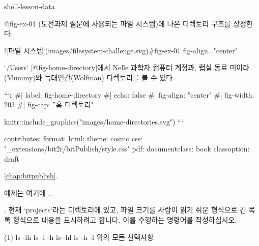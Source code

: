 

shell-lesson-data


@fig-ex-01 (도전과제 질문에 사용되는 파일 시스템)에 나온 디렉토리 구조를 상정한다.

![파일 시스템](images/filesystem-challenge.svg){#fig-ex-01 fig-align="center"}

`/Users`  [@fig-home-directory]에서 Nelle 과학자 컴퓨터 계정과, 랩실 동료 미이라(Mummy)와 늑대인간(Wolfman) 디렉토리를 볼 수 있다.

```{r}
#| label: fig-home-directory
#| echo: false
#| fig-align: "center"
#| fig-width: 203
#| fig-cap: ”홈 디렉토리"

knitr::include_graphics("images/home-directories.svg")
```

\index{}
\textbf{}


contributes:
  format:
    html:
      theme: cosmo
      css: "_extensions/bit2r/bitPublish/style.css"
    pdf:
      documentclass: book
      classoption: draft

\label{chap:bitpublish}
\setcounter{exam_num_bitpub}{0}

\addtocounter{exam_num_bitpub}{1}
\begin{example}{\ref{chap:bitpublish}.}

예제는 여기에 ..

\end{example}


\begin{Exercise}\label{Ex2}

.  현재 `projects`라는 디렉토리에 있고, 파일 크기를 사람이 읽기 쉬운 형식으로 긴 목록 형식으로 내용을 표시하려고 합니다. 이를 수행하는 명령어를 작성하십시오.
\begin{tasks}[label=(\arabic*)](1)
\task  ls -lh
\task  ls -l -h
\task  ls -hl
\task  ls -h -l
\task  위의 모든 선택사항
\end{tasks}

\end{Exercise}






